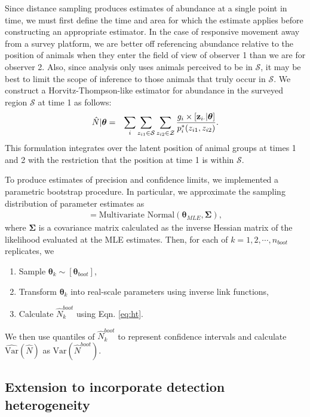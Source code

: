 \documentclass[12pt,fleqn]{article}
\begin{document}
Since distance sampling produces estimates of abundance at a single point in time, we must first define the time and area for which the estimate applies before constructing an appropriate estimator.  In the case of responsive movement away from a survey platform, we are better off referencing abundance relative to the position of animals when they enter the field of view of observer 1 than we are for observer 2.  Also, since analysis only uses animals perceived to be in $\mathcal{S}$, it may be best to limit the scope of inference to those animals that truly occur in $\mathcal{S}$.  We construct a Horvitz-Thompson-like estimator for abundance in the surveyed region $\mathcal{S}$ at time 1 as follows:
\begin{eqnarray}
  \hat{N}|\boldsymbol{\theta} & = & \sum_i \sum_{z_{i1} \in \mathcal{S}} \sum_{z_{i2} \in \mathcal{Z}} \frac{g_i \times [{\bf z}_{i \cdot} | \boldsymbol{\theta}]}{p_i^*(z_{i1},z_{i2})}.
  \label{eq:ht}
\end{eqnarray}
This formulation integrates over the latent position of animal groups at times 1 and 2 with the restriction that the position at time 1 is within $\mathcal{S}$.

To produce estimates of precision and confidence limits, we implemented a parametric bootstrap procedure. In particular, we approximate the sampling distribution of parameter estimates as
\begin{eqnarray*}
  [\boldsymbol{\theta}_{boot}] = \text{Multivariate Normal}(\boldsymbol{\theta}_{MLE},\boldsymbol{\Sigma}),
\end{eqnarray*}
where $\boldsymbol{\Sigma}$ is a covariance matrix calculated as the inverse Hessian matrix of the likelihood evaluated at the MLE estimates. Then, for each of $k = 1, 2, \cdots, n_{boot}$ replicates, we
\begin{enumerate}
  \item Sample $\boldsymbol{\theta}_k \sim [\boldsymbol{\theta}_{boot}]$,
  \item Transform $\boldsymbol{\theta}_k$ into real-scale parameters using inverse link functions,
  \item Calculate $\hat{N}_k^{boot}$ using Eqn. \ref{eq:ht}.
\end{enumerate}
We then use quantiles of $\hat{N}_k^{boot}$ to represent confidence intervals and calculate $\hat{\text{Var}}(\hat{N})$ as $\text{Var}(\hat{N}^{boot})$.

\subsection{Extension to incorporate detection heterogeneity}
\end{document}
